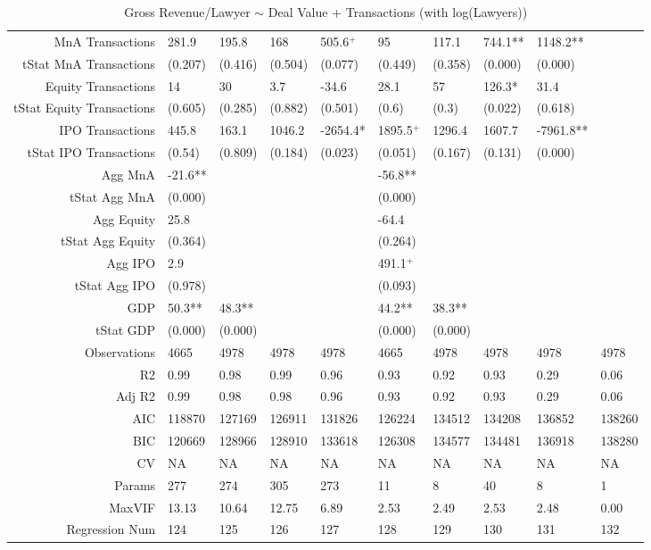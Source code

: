 \begin{table}[ht]
\begin{tabular}{rlllllllll}
  MnA Transactions & 281.9 & 195.8 & 168 & 505.6$^{+}$ & 95 & 117.1 & 744.1** & 1148.2** &  \\ 
  tStat MnA Transactions & (0.207) & (0.416) & (0.504) & (0.077) & (0.449) & (0.358) & (0.000) & (0.000) &  \\ 
  Equity Transactions & 14 & 30 & 3.7 & -34.6 & 28.1 & 57 & 126.3* & 31.4 &  \\ 
  tStat Equity Transactions & (0.605) & (0.285) & (0.882) & (0.501) & (0.6) & (0.3) & (0.022) & (0.618) &  \\ 
  IPO Transactions & 445.8 & 163.1 & 1046.2 & -2654.4* & 1895.5$^{+}$ & 1296.4 & 1607.7 & -7961.8** &  \\ 
  tStat IPO Transactions & (0.54) & (0.809) & (0.184) & (0.023) & (0.051) & (0.167) & (0.131) & (0.000) &  \\ 
  Agg MnA & -21.6** &  &  &  & -56.8** &  &  &  &  \\ 
  tStat Agg MnA & (0.000) &  &  &  & (0.000) &  &  &  &  \\ 
  Agg Equity & 25.8 &  &  &  & -64.4 &  &  &  &  \\ 
  tStat Agg Equity & (0.364) &  &  &  & (0.264) &  &  &  &  \\ 
  Agg IPO & 2.9 &  &  &  & 491.1$^{+}$ &  &  &  &  \\ 
  tStat Agg IPO & (0.978) &  &  &  & (0.093) &  &  &  &  \\ 
  GDP & 50.3** & 48.3** &  &  & 44.2** & 38.3** &  &  &  \\ 
  tStat GDP & (0.000) & (0.000) &  &  & (0.000) & (0.000) &  &  &  \\ 
  Observations & 4665 & 4978 & 4978 & 4978 & 4665 & 4978 & 4978 & 4978 & 4978 \\ 
  R2 & 0.99 & 0.98 & 0.99 & 0.96 & 0.93 & 0.92 & 0.93 & 0.29 & 0.06 \\ 
  Adj R2 & 0.99 & 0.98 & 0.98 & 0.96 & 0.93 & 0.92 & 0.93 & 0.29 & 0.06 \\ 
  AIC & 118870 & 127169 & 126911 & 131826 & 126224 & 134512 & 134208 & 136852 & 138260 \\ 
  BIC & 120669 & 128966 & 128910 & 133618 & 126308 & 134577 & 134481 & 136918 & 138280 \\ 
  CV & NA & NA & NA & NA & NA & NA & NA & NA & NA \\ 
  Params & 277 & 274 & 305 & 273 & 11 & 8 & 40 & 8 & 1 \\ 
  MaxVIF & 13.13 & 10.64 & 12.75 & 6.89 & 2.53 & 2.49 & 2.53 & 2.48 & 0.00 \\ 
  Regression Num & 124 & 125 & 126 & 127 & 128 & 129 & 130 & 131 & 132 \\ 
   \hline
\end{tabular}
\caption{Gross Revenue/Lawyer $\sim$ Deal Value + Transactions (with log(Lawyers))} 
\end{table}
